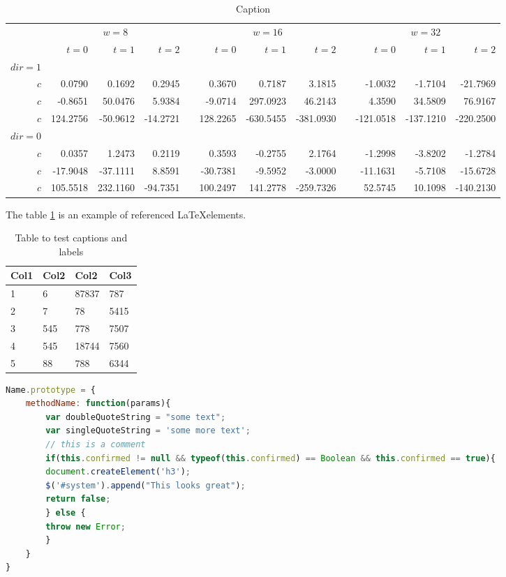 \begin{table}\centering
{}
\begin{tabular}{@{}rrrrcrrrcrrr@{}}\toprule
& \multicolumn{3}{c}{$w = 8$} & \phantom{abc}& \multicolumn{3}{c}{$w = 16$} &
\phantom{abc} & \multicolumn{3}{c}{$w = 32$}\\
\cmidrule{2-4} \cmidrule{6-8} \cmidrule{10-12}
& $t=0$ & $t=1$ & $t=2$ && $t=0$ & $t=1$ & $t=2$ && $t=0$ & $t=1$ & $t=2$\\ \midrule
$dir=1$\\
$c$ & 0.0790 & 0.1692 & 0.2945 && 0.3670 & 0.7187 & 3.1815 && -1.0032 & -1.7104 & -21.7969\\
$c$ & -0.8651& 50.0476& 5.9384&& -9.0714& 297.0923& 46.2143&& 4.3590& 34.5809& 76.9167\\
$c$ & 124.2756& -50.9612& -14.2721&& 128.2265& -630.5455& -381.0930&& -121.0518& -137.1210& -220.2500\\
$dir=0$\\
$c$ & 0.0357& 1.2473& 0.2119&& 0.3593& -0.2755& 2.1764&& -1.2998& -3.8202& -1.2784\\
$c$ & -17.9048& -37.1111& 8.8591&& -30.7381& -9.5952& -3.0000&& -11.1631& -5.7108& -15.6728\\
$c$ & 105.5518& 232.1160& -94.7351&& 100.2497& 141.2778& -259.7326&& 52.5745& 10.1098& -140.2130\\
\bottomrule
\end{tabular}
\caption{Caption}
\end{table}

The table \ref{table:one} is an example of referenced \LaTeX elements.
\begin{table}[h!]
\centering
\begin{tabular}{@{}llll@{}} 
\hline
 Col1 & Col2 & Col2 & Col3 \\ [0.5ex] 
 \hline
 1 & 6 & 87837 & 787 \\ 
 2 & 7 & 78 & 5415 \\
 3 & 545 & 778 & 7507 \\
 4 & 545 & 18744 & 7560 \\
 5 & 88 & 788 & 6344 \\ [1ex] 
 \hline
\end{tabular}
\caption{Table to test captions and labels}
\label{table:one}
\end{table}

\clearpage

\begin{lstlisting}[label=lst1,language=JavaScript,numbers=none,caption=prototype.js,frame=shadowbox]
Name.prototype = {
    methodName: function(params){
        var doubleQuoteString = "some text";
        var singleQuoteString = 'some more text';
        // this is a comment
        if(this.confirmed != null && typeof(this.confirmed) == Boolean && this.confirmed == true){
        document.createElement('h3');
        $('#system').append("This looks great");
        return false;
        } else {
        throw new Error;
        }
    }
}
\end{lstlisting}

